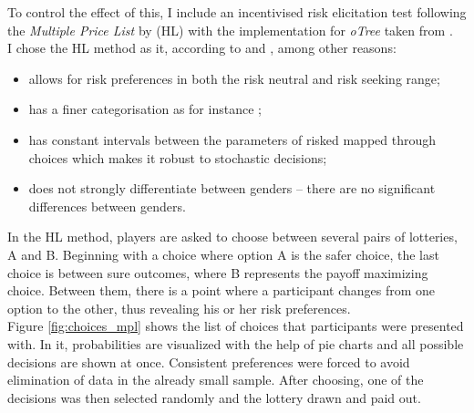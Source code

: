     To control the effect of this, I include an incentivised risk elicitation test following the \textit{Multiple Price List} by \cite{holt2002} (HL) with the implementation for \textit{oTree} taken from \cite{holzmeister2017}.\\
    
    I chose the HL method as it, according to \cite{crosetto2016} and \cite{harrison2008}, among other reasons:
    \begin{itemize}
        \item allows for risk preferences in both the risk neutral and risk seeking range;
        \item has a finer categorisation as for instance \cite{eckel2008};
        \item has constant intervals between the parameters of risked mapped through choices which makes it robust to stochastic decisions;
        \item does not strongly differentiate between genders -- there are no significant differences between genders.
    \end{itemize}  
       
     In the HL method, players are asked to choose between several pairs of lotteries, A and B. Beginning with a choice where option A is the safer choice, the last choice is between sure outcomes, where B represents the payoff maximizing choice. Between them, there is a point where a participant changes from one option to the other, thus revealing his or her risk preferences.\\
     
     Figure \ref{fig:choices_mpl} shows the list of choices that participants were presented with. In it, probabilities are visualized with the help of pie charts and all possible decisions are shown at once. Consistent preferences were forced to avoid elimination of data in the already small sample. After choosing, one of the decisions was then selected randomly and the lottery drawn and paid out.\\
     

